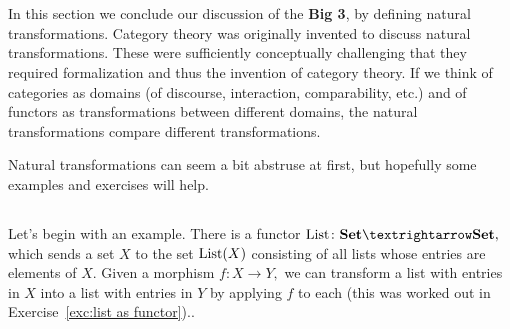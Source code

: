 \documentclass[../main/CT4S-EN-RU]{subfiles}
\begin{document}
\section{}\label{sec:nat trans}

\begin{blockENG}
In this section we conclude our discussion of the {\bf Big 3}, by defining natural transformations. Category theory was originally invented to discuss natural transformations. These were sufficiently conceptually challenging that they required formalization and thus the invention of category theory. If we think of categories as domains (of discourse, interaction, comparability, etc.) and of functors as transformations between different domains, the natural transformations compare different transformations.
\end{blockENG}

\begin{blockRUS}
\end{blockRUS}

\begin{blockENG}
Natural transformations can seem a bit abstruse at first, but hopefully some examples and exercises will help.
\end{blockENG}

\begin{blockRUS}
\end{blockRUS}


\subsection{}

\begin{blockENG}
Let's begin with an example. There is a functor $\List\colon\Set{→}\Set,$ which sends a set $X$ to the set $\operatorname{List}(X)$ consisting of all lists whose entries are elements of $X.$ Given a morphism $f\colon X{→} Y,$ we can transform a list with entries in $X$ into a list with entries in $Y$ by applying $f$ to each (this was worked out in Exercise~\ref{exc:list as functor}).. 
\end{blockENG}

\begin{blockRUS}
\end{blockRUS}
\end{document}
